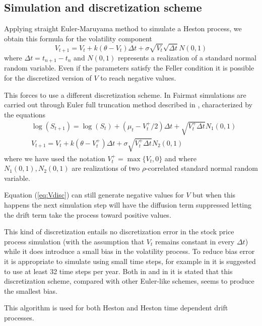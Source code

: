 \subsection{Simulation and discretization scheme}

Applying straight Euler-Maruyama method to simulate a Heston process, we obtain this formula for the volatility component
\begin{equation}
V_{t+1} = V_t + k(\theta - V_t)\Delta t + \sigma\sqrt{V_t}\sqrt{\Delta t} N(0,1)
\end{equation}
where $\Delta t = t_{n+1}-t_n$ and $N(0,1)$ represents a realization of a standard normal random variable. Even if the parameters satisfy the Feller condition it is possible for the discretized version of $V$ to reach negative values.

This forces to use a different discretization scheme. In Fairmat simulations are carried out through Euler full truncation method described in \cite{HaastrechtPelsser:EffHestonSim}, characterized by the equations
\begin{align}
&\log(S_{t+1}) = \log(S_t) + \left(\mu_t - V_t^+/2\right)\Delta t + \sqrt{V_t^+\Delta t} N_1(0,1)\\
&V_{t+1} = V_t + k\left(\theta - V_t^+\right)\Delta t + \sigma\sqrt{V_t^+\Delta t} N_2(0,1)\label{eq:Vdisc}
\end{align}
where we have used the notation $V_t^+=\max\{V_t,0\}$ and where $N_1(0,1), N_2(0,1)$ are realizations of two $\rho$-correlated standard normal random variable.

Equation (\ref{eq:Vdisc}) can still generate negative values for $V$ but when this happens the next simulation step will have the diffusion term suppressed letting the drift term take the process toward positive values.

This kind of discretization entails no discretization error in the stock price process simulation (with the assumption that $V_t$ remains constant in every $\Delta t$) while it does introduce a small bias in the volatility process. To reduce bias error it is appropriate to simulate using small time steps, for example in \cite{HaastrechtPelsser:EffHestonSim} it is suggested to use at least 32 time steps per year. Both in \cite{HaastrechtPelsser:EffHestonSim} and in \cite{Lord:CompBiasSimSchemes} it is stated that this discretization scheme, compared with other Euler-like schemes, seems to produce the smallest bias.

This algorithm is used for both Heston and Heston time dependent drift processes.


